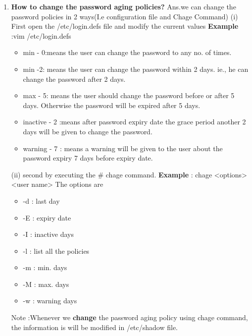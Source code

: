 \begin{enumerate}
    \bigskip
    \bigskip

    \item\textbf{How to change the password aging policies?}
    \newline
    Ans.we can change the password policies in 2 ways(I.e configuration file and Chage Command)
        (i)  First  open the  /etc/login.defs   file and modify the current values
        \newline
        \textbf{Example} :vim /etc/login.defs
           \begin{itemize}
             \item min - 0:means the user can change the password to any no. of times.
             \item min  -2: means the user can change the password within 2 days. ie., he can change the password after 2 days.
             \item max - 5:  means the user should change the password before or after 5 days. Otherwise the password will be expired after 5 days.
             \item inactive - 2 :means after password expiry date the grace period another 2 days will be given to change the password.
             \item warning - 7 : means a warning will be given to the user about the password expiry 7 days before expiry date. 
           \end{itemize}
        (ii)  second by executing the   # chage  command.
        \newline
        \textbf{Example} : chage   <options><user name>
        The options are     \begin{itemize}
                               \item -d : last day
                               \item -E : expiry date
                               \item -I : inactive days
                               \item -l :  list all the policies
                               \item -m :  min. days
                               \item-M  : max. days
                               \item-w  : warning days
                            \end{itemize}
         Note :Whenever we \textbf{change} the password aging policy using  chage   command, the information is will be modified in   /etc/shadow   file.


\end{enumerate}
